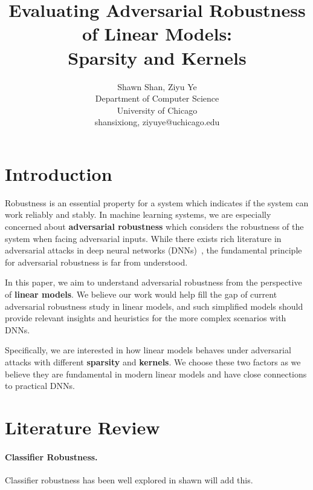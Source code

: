 \documentclass{article}
\title{Evaluating Adversarial Robustness of Linear Models:\\Sparsity and Kernels}
\author{%
  Shawn Shan, Ziyu Ye \\
  Department of Computer Science\\
  University of Chicago\\
  {shansixiong, ziyuye}@uchicago.edu \\
}
\newcommand{\fixme}[1]{{\color{red} #1}}
\begin{document}
\maketitle


\section{Introduction}
Robustness is an essential property for a system which indicates if the system can work reliably and stably. In machine learning systems, we are especially concerned about \textbf{adversarial robustness} which considers the robustness of the system when facing adversarial inputs. While there exists rich literature in adversarial attacks in deep neural networks (DNNs)~\cite{hao2020adversarial}, the fundamental principle for adversarial robustness is far from understood.

In this paper, we aim to understand adversarial robustness from the perspective of \textbf{linear models}. We believe our work would help fill the gap of current adversarial robustness study in linear models, and such simplified models should provide relevant insights and heuristics for the more complex scenarios with DNNs.

Specifically, we are interested in how linear models behaves under adversarial attacks with different \textbf{sparsity} and \textbf{kernels}. We choose these two factors as we believe they are fundamental in modern linear models and have close connections to practical DNNs.


\section{Literature Review}
\paragraph{Classifier Robustness.} Classifier robustness has been well explored in \fixme{shawn will add this.}
\end{document}
